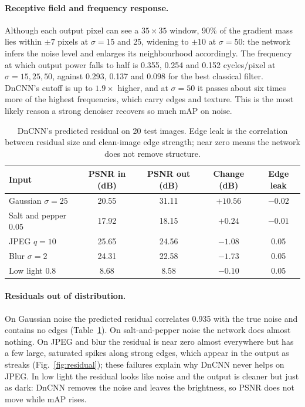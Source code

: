 \documentclass[11pt]{article}
\newcommand{\figref}[1]{Fig.~\ref{#1}}
\newcommand{\tabref}[1]{Table~\ref{#1}}
\begin{document}
\paragraph{Receptive field and frequency response.} Although each output pixel can see a $35\times35$ window, 90\% of the gradient mass lies within $\pm7$ pixels at $\sigma = 15$ and 25, widening to $\pm10$ at $\sigma=50$: the network infers the noise level and enlarges its neighbourhood accordingly. The frequency at which output power falls to half is 0.355, 0.254 and 0.152 cycles/pixel at $\sigma = 15, 25, 50$, against 0.293, 0.137 and 0.098 for the best classical filter. DnCNN's cutoff is up to $1.9\times$ higher, and at $\sigma = 50$ it passes about six times more of the highest frequencies, which carry edges and texture. This is the most likely reason a strong denoiser recovers so much mAP on noise.

\begin{table}[t]
\centering\small
\caption{DnCNN's predicted residual on 20 test images. Edge leak is the correlation between residual size and clean-image edge strength; near zero means the network does not remove structure.}
\label{tab:residual}
\begin{tabular}{@{}lcccc@{}}
\toprule
Input & PSNR in (dB) & PSNR out (dB) & Change (dB) & Edge leak \\
\midrule
Gaussian $\sigma=25$ & 20.55 & 31.11 & $+10.56$ & $-0.02$ \\
Salt and pepper 0.05 & 17.92 & 18.15 & $+0.24$ & $-0.01$ \\
JPEG $q=10$ & 25.65 & 24.56 & $-1.08$ & 0.05 \\
Blur $\sigma=2$ & 24.31 & 22.58 & $-1.73$ & 0.05 \\
Low light 0.8 & 8.68 & 8.58 & $-0.10$ & 0.05 \\
\bottomrule
\end{tabular}
\end{table}

\paragraph{Residuals out of distribution.} On Gaussian noise the predicted residual correlates 0.935 with the true noise and contains no edges (\tabref{tab:residual}). On salt-and-pepper noise the network does almost nothing. On JPEG and blur the residual is near zero almost everywhere but has a few large, saturated spikes along strong edges, which appear in the output as streaks (\figref{fig:residual}); these failures explain why DnCNN never helps on JPEG. In low light the residual looks like noise and the output is cleaner but just as dark: DnCNN removes the noise and leaves the brightness, so PSNR does not move while mAP rises.
\end{document}
